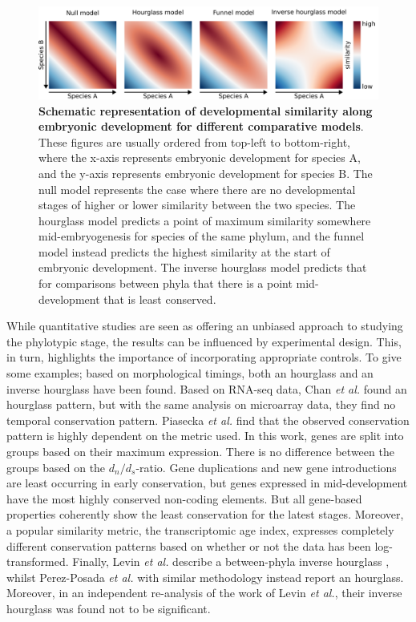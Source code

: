 \begin{figure}[H]
    \includegraphics[width=\linewidth]{ch.hourglass/images/models.png}
    \caption{\textbf{Schematic representation of developmental similarity along embryonic development for different comparative models}. These figures are usually ordered from top-left to bottom-right, where the x-axis represents embryonic development for species A, and the y-axis represents embryonic development for species B. The null model represents the case where there are no developmental stages of higher or lower similarity between the two species. The hourglass model predicts a point of maximum similarity somewhere mid-embryogenesis for species of the same phylum, and the funnel model instead predicts the highest similarity at the start of embryonic development. The inverse hourglass model predicts that for comparisons between phyla that there is a point mid-development that is least conserved.}
    \label{fig:models}
\end{figure}

While quantitative studies are seen as offering an unbiased approach to studying the phylotypic stage, the results can be influenced by experimental design. This, in turn, highlights the importance of incorporating appropriate controls. To give some examples; based on morphological timings, both an hourglass\cite{Cordero2020} and an inverse hourglass\cite{OlafRP2003} have been found. Based on RNA-seq data, Chan \textit{et al.} found an hourglass pattern, but with the same analysis on microarray data, they find no temporal conservation pattern\cite{Chan2021}. Piasecka \textit{et al.} find that the observed conservation pattern is highly dependent on the metric used. In this work, genes are split into groups based on their maximum expression. There is no difference between the groups based on the $d_n / d_s$-ratio. Gene duplications and new gene introductions are least occurring in early conservation, but genes expressed in mid-development have the most highly conserved non-coding elements. But all gene-based properties coherently show the least conservation for the latest stages\cite{Piasecka2013}. Moreover, a popular similarity metric, the transcriptomic age index\cite{DomazetLoso2010}, expresses completely different conservation patterns based on whether or not the data has been log-transformed\cite{Piasecka2013}. Finally, Levin \textit{et al.} describe a between-phyla inverse hourglass \cite{Levin2016}, whilst Perez-Posada \textit{et al.} with similar methodology instead report an hourglass\cite{PerezPosada2022}. Moreover, in an independent re-analysis of the work of Levin \textit{et al.}, their inverse hourglass was found not to be significant\cite{Dunn2018}.

